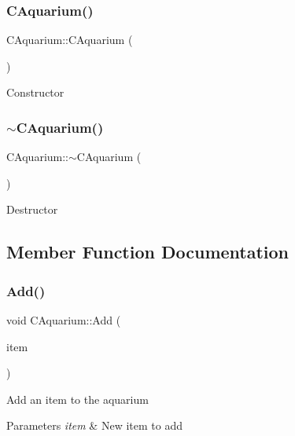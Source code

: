 \subsubsection{\texorpdfstring{C\+Aquarium()}{CAquarium()}}
{\footnotesize\ttfamily C\+Aquarium\+::\+C\+Aquarium (\begin{DoxyParamCaption}{ }\end{DoxyParamCaption})}

Constructor \mbox{\label{class_c_aquarium_ab1baf78dc047af2b8cab8982e1446875}} 
\subsubsection{\texorpdfstring{$\sim$\+C\+Aquarium()}{~CAquarium()}}
{\footnotesize\ttfamily C\+Aquarium\+::$\sim$\+C\+Aquarium (\begin{DoxyParamCaption}{ }\end{DoxyParamCaption})\hspace{0.3cm}{\ttfamily [virtual]}}

Destructor 

\subsection{Member Function Documentation}
\mbox{\label{class_c_aquarium_a85063d05c147cf80f54182016fe12d64}} 
\subsubsection{\texorpdfstring{Add()}{Add()}}
{\footnotesize\ttfamily void C\+Aquarium\+::\+Add (\begin{DoxyParamCaption}\item[{std\+::shared\+\_\+ptr$<$ \hyperlink{class_c_item}{C\+Item} $>$}]{item }\end{DoxyParamCaption})}

Add an item to the aquarium 
\begin{DoxyParams}{Parameters}
{\em item} & New item to add \\
\hline
\end{DoxyParams}
\mbox{\label{class_c_aquarium_a600f0ffe730776b9d5539511a4b191b9}} 

